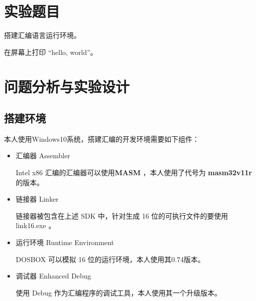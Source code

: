 \section{实验题目}

搭建汇编语言运行环境。

在屏幕上打印 “hello, world”。

\section{问题分析与实验设计}

\subsection{搭建环境}

本人使用Windows10系统，搭建汇编的开发环境需要如下组件：

\begin{itemize}
    
    \item 汇编器 Assembler
    
    Intel x86 汇编的汇编器可以使用\textbf{MASM \footnotemark}，本人使用了代号为 \textbf{masm32v11r} 的版本。
    
    
    \item 链接器 Linker
    
    链接器被包含在上述 SDK 中，针对生成 16 位的可执行文件的要使用 link16.exe 。
    
    \item 运行环境 Runtime Environment
    
    DOSBOX \footnotemark 可以模拟 16 位的运行环境，本人使用其0.74版本。
    
    
    \item 调试器 Enhanced Debug
    
    使用 Debug \footnotemark 作为汇编程序的调试工具，本人使用其一个升级版本。
    
    
\end{itemize}

